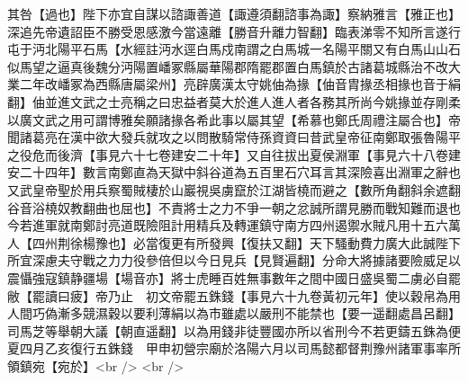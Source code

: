 其咎【過也】陛下亦宜自謀以諮諏善道【諏遵須翻諮事為諏】察納雅言【雅正也】深追先帝遺詔臣不勝受恩感激今當遠離【勝音升離力智翻】臨表涕零不知所言遂行屯于沔北陽平石馬【水經註沔水逕白馬戍南謂之白馬城一名陽平關又有白馬山山石似馬望之逼真後魏分沔陽置嶓冢縣屬華陽郡隋罷郡置白馬鎮於古諸葛城縣治不改大業二年改嶓冢為西縣唐屬梁州】亮辟廣漢太守姚伷為掾【伷音胄掾丞相掾也音于絹翻】伷並進文武之士亮稱之曰忠益者莫大於進人進人者各務其所尚今姚掾並存剛柔以廣文武之用可謂博雅矣願諸掾各希此事以屬其望【希慕也鄭氏周禮注屬合也】帝聞諸葛亮在漢中欲大發兵就攻之以問散騎常侍孫資資曰昔武皇帝征南鄭取張魯陽平之役危而後濟【事見六十七卷建安二十年】又自往拔出夏侯淵軍【事見六十八卷建安二十四年】數言南鄭直為天獄中斜谷道為五百里石穴耳言其深險喜出淵軍之辭也又武皇帝聖於用兵察蜀賊棲於山巖視吳虜竄於江湖皆橈而避之【數所角翻斜余遮翻谷音浴橈奴教翻曲也屈也】不責將士之力不爭一朝之忿誠所謂見勝而戰知難而退也今若進軍就南鄭討亮道既險阻計用精兵及轉運鎮守南方四州遏禦水賊凡用十五六萬人【四州荆徐楊豫也】必當復更有所發興【復扶又翻】天下騷動費力廣大此誠陛下所宜深慮夫守戰之力力役參倍但以今日見兵【見賢遍翻】分命大將據諸要險威足以震懾強寇鎮静疆場【場音亦】將士虎睡百姓無事數年之間中國日盛吳蜀二虜必自罷敝【罷讀曰疲】帝乃止　初文帝罷五銖錢【事見六十九卷黃初元年】使以穀帛為用人間巧偽漸多競濕穀以要利薄絹以為市雖處以嚴刑不能禁也【要一遥翻處昌呂翻】司馬芝等舉朝大議【朝直遥翻】以為用錢非徒豐國亦所以省刑今不若更鑄五銖為便夏四月乙亥復行五銖錢　甲申初營宗廟於洛陽六月以司馬懿都督荆豫州諸軍事率所領鎮宛【宛於】<br />
<br />

